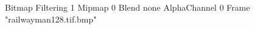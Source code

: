 {Bitmap
	{Filtering 1}
	{Mipmap 0}
	{Blend none}
	{AlphaChannel 0}
	{Frame "railwayman128.tif.bmp"}
}
